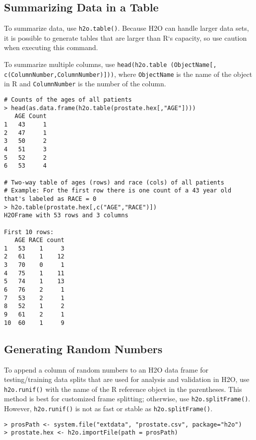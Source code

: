 {\newpage

\subsection{Summarizing Data in a Table}

To summarize data, use {\texttt{h2o.table()}}. Because H2O can handle larger data sets, it is possible to generate tables that are larger than R`s capacity, so use caution when executing this command. 

To summarize multiple columns, use {\texttt{head(h2o.table (ObjectName[, c(ColumnNumber,ColumnNumber)]))}}, where {\texttt{ObjectName}} is the name of the object in R and {\texttt{ColumnNumber}} is the number of the column. 


\begin{lstlisting}[style=R]
# Counts of the ages of all patients
> head(as.data.frame(h2o.table(prostate.hex[,"AGE"])))
   AGE Count
1   43     1
2   47     1
3   50     2
4   51     3
5   52     2
6   53     4

# Two-way table of ages (rows) and race (cols) of all patients
# Example: For the first row there is one count of a 43 year old that's labeled as RACE = 0
> h2o.table(prostate.hex[,c("AGE","RACE")])
H2OFrame with 53 rows and 3 columns

First 10 rows:
   AGE RACE count
1   53    1     3
2   61    1    12
3   70    0     1
4   75    1    11
5   74    1    13
6   76    2     1
7   53    2     1
8   52    1     2
9   61    2     1
10  60    1     9
\end{lstlisting}
\newpage
\subsection{Generating Random Numbers}

To append a column of random numbers to an H2O data frame for testing/training data splits that are used for analysis and validation in H2O, use {\texttt{h2o.runif()}} with the name of the R reference object in the parentheses. This method is best for customized frame splitting; otherwise, use {\texttt{h2o.splitFrame()}}. However, {\texttt{h2o.runif()}} is not as fast or stable as {\texttt{h2o.splitFrame()}}. 

\begin{lstlisting}[style=R]
> prosPath <- system.file("extdata", "prostate.csv", package="h2o")
> prostate.hex <- h2o.importFile(path = prosPath)


\end{lstlisting}}
